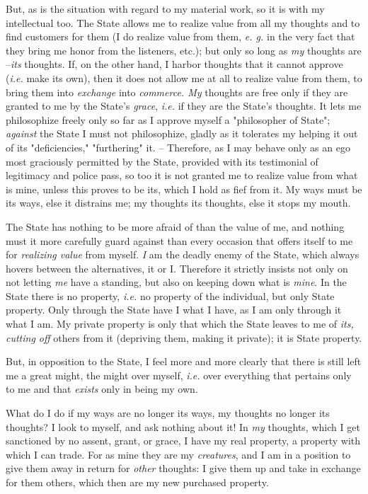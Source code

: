 But, as is the situation with regard to my material work, so it is with my 
intellectual too. The State allows me to realize value from all my thoughts 
and to find customers for them (I do realize value from them, \textit{e. g.} 
in the very fact that they bring me honor from the listeners, etc.); but only 
so long as \textit{my} thoughts are --\textit{its} thoughts. If, on the other 
hand, I harbor thoughts that it cannot approve (\textit{i.e.} make its own), 
then it does not allow me at all to realize value from them, to bring them 
into \textit{exchange} into \textit{commerce. My} thoughts are free only if 
they are granted to me by the State's \textit{grace}, \textit{i.e.} if they 
are the State's thoughts. It lets me philosophize freely only so far as I 
approve myself a "{}philosopher of State"{}; \textit{against} the State I must 
not philosophize, gladly as it tolerates my helping it out of its 
"{}deficiencies,"{} "{}furthering"{} it. -- Therefore, as I may behave only as 
an ego most graciously permitted by the State, provided with its testimonial 
of legitimacy and police pass, so too it is not granted me to realize value 
from what is mine, unless this proves to be its, which I hold as fief from it. 
My ways must be its ways, else it distrains me; my thoughts its thoughts, else 
it stops my mouth.

The State has nothing to be more afraid of than the value of me, and nothing 
must it more carefully guard against than every occasion that offers itself to 
me for \textit{realizing value} from myself. \textit{I} am the deadly enemy of 
the State, which always hovers between the alternatives, it or I. Therefore it 
strictly insists not only on not letting \textit{me} have a standing, but also 
on keeping down what is \textit{mine}. In the State there is no property, 
\textit{i.e.} no property of the individual, but only State property. Only 
through the State have I what I have, as I am only through it what I am. My 
private property is only that which the State leaves to me of \textit{its, 
cutting off} others from it (depriving them, making it private); it is State 
property.

But, in opposition to the State, I feel more and more clearly that there is 
still left me a great might, the might over myself, \textit{i.e.} over 
everything that pertains only to me and that \textit{exists} only in being my 
own.

What do I do if my ways are no longer its ways, my thoughts no longer its 
thoughts? I look to myself, and ask nothing about it! In \textit{my} thoughts, 
which I get sanctioned by no assent, grant, or grace, I have my real property, 
a property with which I can trade. For as mine they are my \textit{creatures}, 
and I am in a position to give them away in return for \textit{other} 
thoughts: I give them up and take in exchange for them others, which then are 
my new purchased property.

